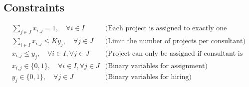 \documentclass{article}
\begin{document}
\subsection*{Constraints}
\begin{align}
    & \sum_{j \in J} x_{i,j} = 1, \quad \forall i \in I & \text{(Each project is assigned to exactly one consultant)} \\
    & \sum_{i \in I} x_{i,j} \leq K y_j, \quad \forall j \in J & \text{(Limit the number of projects per consultant)} \\
    & x_{i,j} \leq y_j, \quad \forall i \in I, \forall j \in J & \text{(Project can only be assigned if consultant is hired)} \\
    & x_{i,j} \in \{0,1\}, \quad \forall i \in I, \forall j \in J & \text{(Binary variables for assignment)} \\
    & y_j \in \{0,1\}, \quad \forall j \in J & \text{(Binary variables for hiring)}
\end{align}
\end{document}

